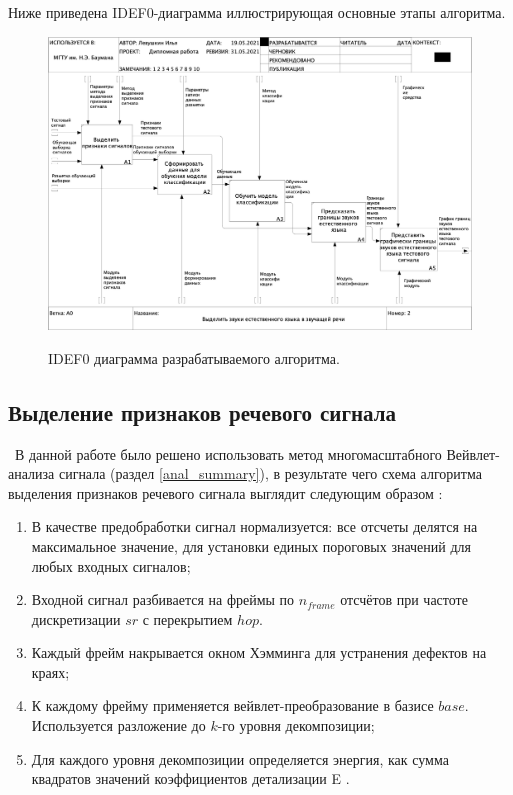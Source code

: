 \documentclass[utf8x, 14pt, oneside, a4paper]{article}
\begin{document}
	Ниже приведена IDEF0-диаграмма иллюстрирующая основные этапы алгоритма.
	
	\begin{figure}[h!]
		\begin{center}
			{\includegraphics[scale = 0.3]{img/ramus_A1-A5.png}}
		\end{center}
		\caption{IDEF0 диаграмма разрабатываемого алгоритма.}
		\label{ris:ramus_A1-A5}
	\end{figure}

	\subsection{Выделение признаков речевого сигнала}\label{features_preprocessing}
	
	 В данной работе было решено использовать метод многомасштабного Вейвлет-анализа сигнала (раздел \ref{anal_summary}), в результате чего схема алгоритма выделения признаков речевого сигнала выглядит следующим образом \cite{vevlet_1}:

	\begin{enumerate}
		\item В качестве предобработки сигнал нормализуется: все отсчеты делятся на максимальное значение, для установки единых пороговых значений для любых входных сигналов;
		\item Входной сигнал разбивается на фреймы по $n_{frame}$ отсчётов при частоте дискретизации $sr$ с перекрытием $hop$.
		\item Каждый фрейм накрывается окном Хэмминга для устранения дефектов на краях;
		\item К каждому фрейму применяется вейвлет-преобразование в базисе $base$. Используется разложение до $k$-го уровня декомпозиции;
		\item Для каждого уровня декомпозиции определяется энергия, как сумма
		квадратов значений коэффициентов детализации E \cite{rem}.
	\end{enumerate}
\end{document}
